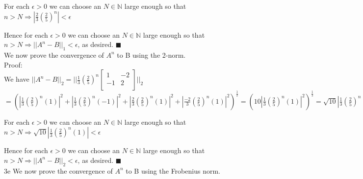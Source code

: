 \documentclass[letterpaper,12pt]{article}
\theoremstyle{definition}
\begin{document}
 For each $\epsilon >0$ we can choose an $N\in \mathbb{N}$ large enough so that $n > N \Rightarrow |\frac{2}{3}(\frac{2}{5})^n| <\epsilon$ 
 
 Hence for each  $\epsilon >0$ we can choose an $N\in \mathbb{N}$ large enough so that $n > N \Rightarrow ||A^n-B||_1 <\epsilon$, as desired.  \hfill $\blacksquare$\\

We now prove the convergence of $A^n$ to B using the 2-norm.\\
Proof:\\

We have  $||A^n-B||_{2} = || 
  \frac{1}{3}(\frac{2}{5})^n
  \begin{bmatrix}
   1 &  -2 \\
   -1 &  2\\
  \end{bmatrix}    ||_{2} $\\
  
  $= ( |\frac{1}{3}(\frac{2}{5})^n(1)|^2 +  |\frac{1}{3}(\frac{2}{5})^n(-1)|^2 + |\frac{2}{3}(\frac{2}{5})^n(1)|^2 + |\frac{-2}{3}(\frac{2}{5})^n(1)|^2                               )^{\frac{1}{2}} = (10|\frac{1}{3}(\frac{2}{5})^n(1)|^2)^{\frac{1}{2}} =\sqrt{10}|\frac{1}{3}(\frac{2}{5})^n(1)| $

 For each $\epsilon >0$ we can choose an $N\in \mathbb{N}$ large enough so that $n > N \Rightarrow \sqrt{10}|\frac{1}{3}(\frac{2}{5})^n(1)| <\epsilon$ 
 
 Hence for each  $\epsilon >0$ we can choose an $N\in \mathbb{N}$ large enough so that $n > N \Rightarrow ||A^n-B||_{2} <\epsilon$, as desired.  \hfill $\blacksquare$\\
3e
 We now prove the convergence of $A^n$ to B using the Frobenius norm.\\
 
\end{document}
